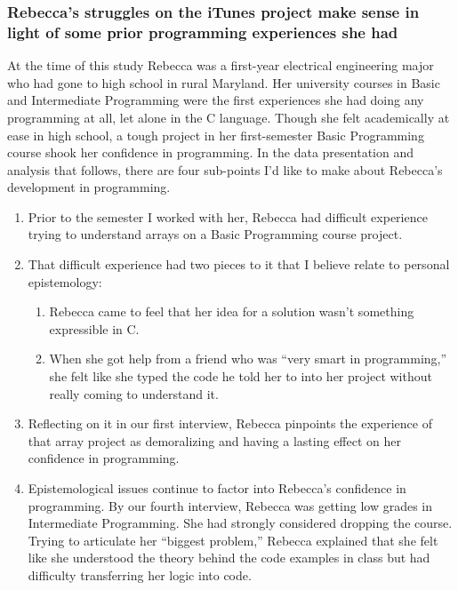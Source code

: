 \subsubsection{\texorpdfstring{\protect\hypertarget{ux5fToc247188558}{}{\protect\hypertarget{ux5fToc252445932}{}{}}Rebecca's
struggles on the iTunes project make sense in light of some prior
programming experiences she
had}{Rebecca's struggles on the iTunes project make sense in light of some prior programming experiences she had}}\label{rebeccas-struggles-on-the-itunes-project-make-sense-in-light-of-some-prior-programming-experiences-she-had}

At the time of this study Rebecca was a first-year electrical
engineering major who had gone to high school in rural Maryland. Her
university courses in Basic and Intermediate Programming were the first
experiences she had doing any programming at all, let alone in the C
language. Though she felt academically at ease in high school, a tough
project in her first-semester Basic Programming course shook her
confidence in programming. In the data presentation and analysis that
follows, there are four sub-points I'd like to make about Rebecca's
development in programming.

\begin{enumerate}
\def\labelenumi{\arabic{enumi}.}
\item
  Prior to the semester I worked with her, Rebecca had difficult
  experience trying to understand arrays on a Basic Programming course
  project.
\item
  That difficult experience had two pieces to it that I believe relate
  to personal epistemology:

  \begin{enumerate}
  \def\labelenumii{\alph{enumii}.}
  \item
    Rebecca came to feel that her idea for a solution wasn't something
    expressible in C.
  \item
    When she got help from a friend who was ``very smart in
    programming,'' she felt like she typed the code he told her to into
    her project without really coming to understand it.
  \end{enumerate}
\item
  Reflecting on it in our first interview, Rebecca pinpoints the
  experience of that array project as demoralizing and having a lasting
  effect on her confidence in programming.
\item
  Epistemological issues continue to factor into Rebecca's confidence in
  programming. By our fourth interview, Rebecca was getting low grades
  in Intermediate Programming. She had strongly considered dropping the
  course. Trying to articulate her ``biggest problem,'' Rebecca
  explained that she felt like she understood the theory behind the code
  examples in class but had difficulty transferring her logic into code.
\end{enumerate}

